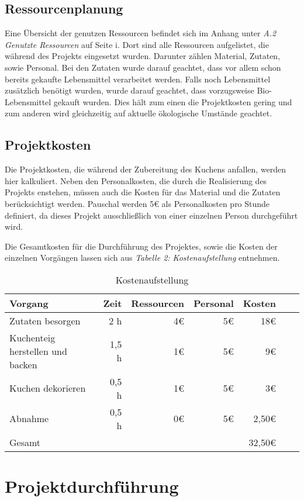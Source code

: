 \subsection{Ressourcenplanung}
Eine Übersicht der genutzen Ressourcen befindet sich im Anhang unter \emph{A.2 Genutzte Ressourcen} auf Seite i. Dort
sind alle Ressourcen aufgelistet, die während des Projekts eingesetzt wurden. Darunter
zählen Material, Zutaten, sowie Personal. Bei den Zutaten wurde darauf geachtet, dass vor allem schon bereits gekaufte Lebensmittel verarbeitet werden.
Falls noch Lebensmittel zusätzlich benötigt wurden, wurde darauf geachtet, dass vorzugsweise Bio-Lebensmittel gekauft wurden.
Dies hält zum einen die Projektkosten gering und zum anderen wird gleichzeitig auf aktuelle ökologische Umstände geachtet.

\subsection{Projektkosten}
Die Projektkosten, die während der Zubereitung des Kuchens anfallen, werden hier kalkuliert.
Neben den Personalkosten, die durch die Realisierung des Projekts enstehen, müssen auch die Kosten für das Material und die Zutaten berücksichtigt werden.
Pauschal werden 5€ als Personalkosten pro Stunde definiert, da dieses Projekt ausschließlich von einer einzelnen Person durchgeführt wird.

Die Gesamtkosten für die Durchführung des Projektes, sowie die Kosten der einzelnen Vorgängen lassen sich aus \emph{Tabelle 2: Kostenaufstellung} entnehmen.

\begin{table}[h]
    \centering
    \begin{tabular}{l*{5}{r}|r|}
        \hline
        Vorgang    & Zeit  &    Ressourcen & Personal & Kosten\\
        \hline
        Zutaten besorgen & 2 h & 4€ & 5€ & 18€\\
        Kuchenteig herstellen und backen    & 1,5 h & 1€ & 5€  & 9€ \\
        Kuchen dekorieren      & 0,5 h & 1€ & 5€ & 3€   \\
        Abnahme & 0,5 h & 0€ & 5€ & 2,50€ \\
        \hline
        Gesamt & & & & 32,50€ \\
        \hline
        \end{tabular}
        \caption{Kostenaufstellung}
\end{table}
\section{Projektdurchführung}
